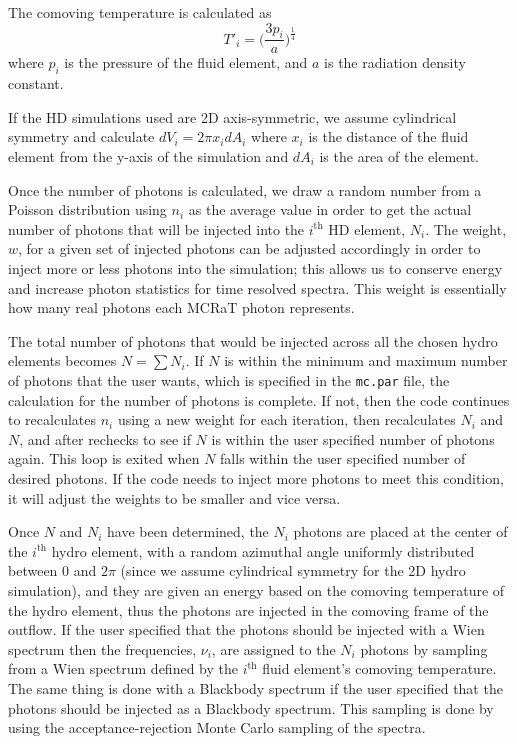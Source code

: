 \documentclass[12pt,a4paper]{article}
\begin{document}
The comoving temperature is calculated as
\begin{equation}
T'_i=\big( \frac{3p_i}{a} \big)^\frac{1}{4}
\end{equation}
where $p_i$ is the pressure of the fluid element, and $a$ is the radiation density constant.
 
If the HD simulations used are 2D axis-symmetric, we assume cylindrical symmetry and calculate $dV_i=2\pi x_idA_i$ where $x_i$ is the distance of the fluid element from the y-axis of the simulation and $dA_i$ is the area of the element. 
 
Once the number of photons is calculated, we draw a random number from a Poisson distribution using $n_i$ as the average value in order to get the actual number of photons that will be injected into the $i^\text{th}$ HD element, $N_i$. The weight, $w$, for a given set of injected photons can be adjusted accordingly in order to inject more or less photons into the simulation; this allows us to conserve energy and increase photon statistics for time resolved spectra. This weight is essentially how many real photons each MCRaT photon represents.

The total number of photons that would be injected across all the chosen hydro elements becomes $N=\sum N_i$. If $N$ is within the minimum and maximum number of photons that the user wants, which is specified in the \texttt{mc.par} file, the calculation for the number of photons is complete. If not, then the code continues to recalculates $n_i$ using a new weight for each iteration, then recalculates $N_i$ and $N$, and after rechecks to see if $N$ is within the user specified number of photons again. This loop is exited when $N$ falls within the user specified number of desired photons. If the code needs to inject more photons to meet this condition, it will adjust the weights to be smaller and vice versa.

Once $N$ and $N_i$ have been determined, the $N_i$ photons are placed at the center of the $i^\mathrm{th}$ hydro element, with a random azimuthal angle uniformly distributed between $0$ and $2\pi$ (since we assume cylindrical symmetry for the 2D hydro simulation), and they are given an energy based on the comoving temperature of the hydro element, thus the photons are injected in the comoving frame of the outflow. If the user specified that the photons should be injected with a Wien spectrum then the frequencies, $\nu_i$, are assigned to the $N_i$ photons by sampling from a Wien spectrum defined by the $i^\mathrm{th}$ fluid element's comoving temperature. The same thing is done with a Blackbody spectrum if the user specified that the photons should be injected as a Blackbody spectrum. This sampling is done by using the acceptance-rejection Monte Carlo sampling of the spectra.
\end{document}
